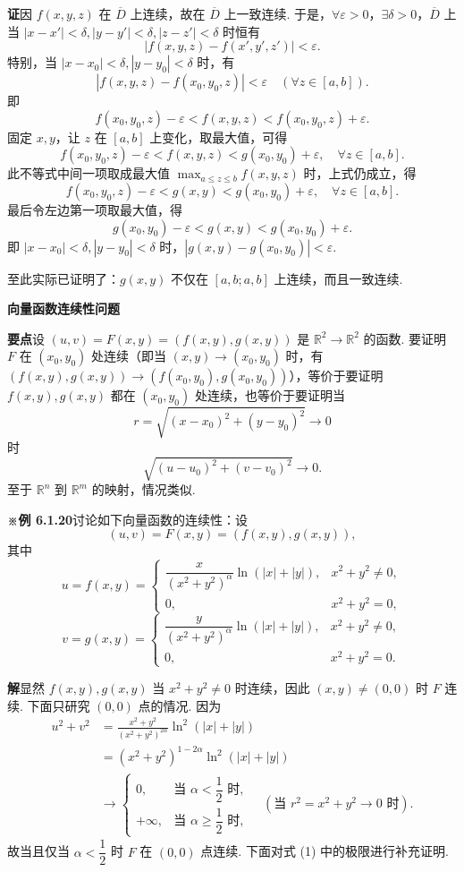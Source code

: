 \documentclass[UTF8, 12pt, fontset=fandol, oneside]{ctexart}
\begin{document}
\noindent\textbf{证}\quad 因 $f(x,y,z)$ 在 $\overline D$ 上连续，故在 $\overline D$ 上一致连续. 于是，$\forall\varepsilon>0$，$\exists\delta>0$，$\overline D$ 上当 $|x-x'|<\delta,|y-y'|<\delta,|z-z'|<\delta$ 时恒有
\[
  |f(x,y,z)-f(x',y',z')|<\varepsilon.
\]
特别，当 $|x-x_0|<\delta,|y-y_0|<\delta$ 时，有
\[
  |f(x,y,z)-f(x_0,y_0,z)|<\varepsilon\quad(\forall z\in[a,b]).
\]
即
\[
  f(x_0,y_0,z)-\varepsilon<f(x,y,z)<f(x_0,y_0,z)+\varepsilon.
\]
固定 $x,y$，让 $z$ 在 $[a,b]$ 上变化，取最大值，可得
\[
  f(x_0,y_0,z)-\varepsilon<f(x,y,z)<g(x_0,y_0)+\varepsilon,
  \quad \forall z\in[a,b].
\]
此不等式中间一项取成最大值 $\displaystyle\max_{a\le z\le b}f(x,y,z)$ 时，上式仍成立，得
\[
  f(x_0,y_0,z)-\varepsilon<g(x,y)<g(x_0,y_0)+\varepsilon,\quad \forall z\in[a,b].
\]
最后令左边第一项取最大值，得
\[
  g(x_0,y_0)-\varepsilon<g(x,y)<g(x_0,y_0)+\varepsilon.
\]
即 $|x-x_0|<\delta,|y-y_0|<\delta$ 时，$|g(x,y)-g(x_0,y_0)|<\varepsilon$.

至此实际已证明了：$g(x,y)$ 不仅在 $[a,b;a,b]$ 上连续，而且一致连续.

\noindent\textbf{向量函数连续性问题}

\noindent\textbf{要点}\quad 设 $(u,v)=F(x,y)=(f(x,y),g(x,y))$ 是 $\mathbb{R}^2\to\mathbb{R}^2$ 的函数. 要证明 $F$ 在 $(x_0,y_0)$ 处连续（即当 $(x,y)\to(x_0,y_0)$ 时，有 $(f(x,y),g(x,y))\to(f(x_0,y_0),g(x_0,y_0))$），等价于要证明 $f(x,y),g(x,y)$ 都在 $(x_0,y_0)$ 处连续，也等价于要证明当
\[
  r=\sqrt{(x-x_0)^2+(y-y_0)^2}\to0
\]
时
\[
  \sqrt{(u-u_0)^2+(v-v_0)^2}\to0.
\]
至于 $\mathbb{R}^n$ 到 $\mathbb{R}^m$ 的映射，情况类似.

\noindent\textbf{※例 6.1.20}\quad 讨论如下向量函数的连续性：设
\[
  (u,v)=F(x,y)=(f(x,y),g(x,y)),
\]
其中
\[
u=f(x,y)=
\begin{cases}
\dfrac{x}{(x^2+y^2)^\alpha}\ln(|x|+|y|), & x^2+y^2\ne0,\\
0, & x^2+y^2=0,
\end{cases}
\]
\[
v=g(x,y)=
\begin{cases}
\dfrac{y}{(x^2+y^2)^\alpha}\ln(|x|+|y|), & x^2+y^2\ne0,\\
0, & x^2+y^2=0.
\end{cases}
\]

\noindent\textbf{解}\quad 显然 $f(x,y),g(x,y)$ 当 $x^2+y^2\ne0$ 时连续，因此 $(x,y)\ne(0,0)$ 时 $F$ 连续. 下面只研究 $(0,0)$ 点的情况. 因为
\begin{equation}
\begin{aligned}
u^2+v^2
&=\frac{x^2+y^2}{(x^2+y^2)^{2\alpha}}\ln^2(|x|+|y|)\\
&=(x^2+y^2)^{1-2\alpha}\ln^2(|x|+|y|)\\
&\to
\begin{cases}
0, & \text{当 }\alpha<\dfrac12\text{ 时},\\
+\infty, & \text{当 }\alpha\ge\dfrac12\text{ 时},
\end{cases}
\quad(\text{当 }r^2=x^2+y^2\to0\text{ 时}).
\end{aligned}
\tag{1}
\end{equation}
故当且仅当 $\alpha<\dfrac12$ 时 $F$ 在 $(0,0)$ 点连续. 下面对式 (1) 中的极限进行补充证明.
\end{document}
